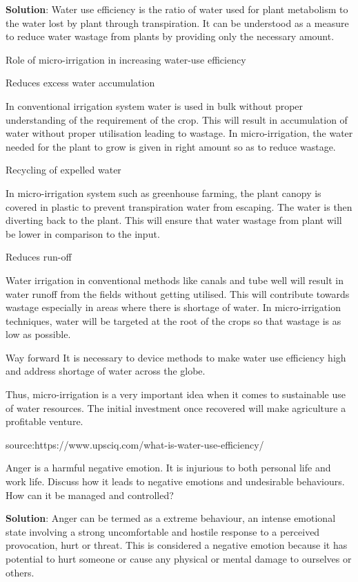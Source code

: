 \documentclass[
]{book}
\newcommand{\question}{\item}
\newenvironment{solution}{ {\bfseries Solution}:}{}
\begin{document}
\begin{questions}
\begin{solution}
Water use efficiency is the ratio of water used for plant metabolism to the water lost by plant through transpiration. It can be understood as a measure to reduce water wastage from plants by providing only the necessary amount.

Role of micro-irrigation in increasing water-use efficiency

Reduces excess water accumulation
    
In conventional irrigation system water is used in bulk without proper understanding of the requirement of the crop. This will result in accumulation of water without proper utilisation leading to wastage. In micro-irrigation, the water needed for the plant to grow is given in right amount so as to reduce wastage.

Recycling of expelled water

In micro-irrigation system such as greenhouse farming, the plant canopy is covered in plastic to prevent transpiration water from escaping. The water is then diverting back to the plant. This will ensure that water wastage from plant will be lower in comparison to the input.

Reduces run-off

Water irrigation in conventional methods like canals and tube well will result in water runoff from the fields without getting utilised. This will contribute towards wastage especially in areas where there is shortage of water. In micro-irrigation techniques, water will be targeted at the root of the crops so that wastage is as low as possible.

Way forward
It is necessary to device methods to make water use efficiency high and address shortage of water across the globe.

Thus, micro-irrigation is a very important idea when it comes to sustainable use of water resources. The initial investment once recovered will make agriculture a profitable venture.

source:https://www.upsciq.com/what-is-water-use-efficiency/
\end{solution}

\question Anger is a harmful negative emotion. It is injurious to both personal life and work life. Discuss how it leads to negative emotions and undesirable behaviours. How can it be managed and controlled?

\begin{solution}
Anger can be termed as a extreme behaviour, an intense emotional state involving a strong uncomfortable and hostile response to a perceived provocation, hurt or threat. This is considered a negative emotion because it has potential to hurt someone or cause any physical or mental damage to ourselves or others.


\end{solution}
\end{questions}
\end{document}
